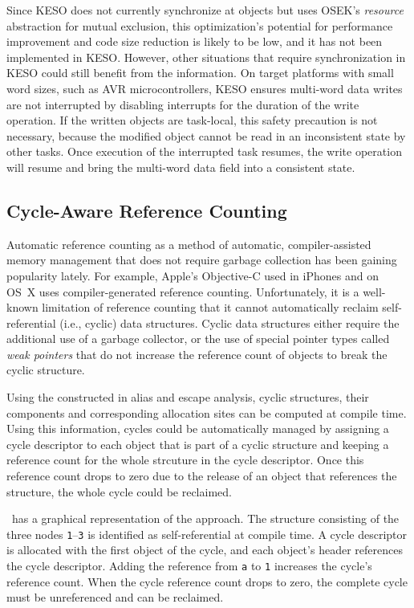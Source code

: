 			Since KESO does not currently synchronize at objects but uses OSEK's \emph{resource} abstraction for mutual
			exclusion, this optimization's potential for performance improvement and code size reduction is likely to be low,
			and it has not been implemented in KESO\@. However, other situations that require synchronization in KESO could
			still benefit from the information. On target platforms with small word sizes, such as AVR microcontrollers, KESO
			ensures multi-word data writes are not interrupted by disabling interrupts for the duration of the write
			operation. If the written objects are task-local, this safety precaution is not necessary, because the modified
			object cannot be read in an inconsistent state by other tasks. Once execution of the interrupted task resumes, the
			write operation will resume and bring the multi-word data field into a consistent state.

		\subsection{Cycle-Aware Reference Counting}
			\label{sub:ea:apps:cyclerefcnt}
			Automatic reference counting as a method of automatic, compiler-assisted memory management that does not require
			garbage collection has been gaining popularity lately. For example, Apple's Objective-C used in iPhones and on
			OS~X uses compiler-generated reference counting. Unfortunately, it is a well-known limitation of reference
			counting that it cannot automatically reclaim self-referential (i.e., cyclic) data structures. Cyclic data
			structures either require the additional use of a garbage collector, or the use of special pointer types called
			\emph{weak pointers} that do not increase the reference count of objects to break the cyclic structure.

			Using the  constructed in alias and escape analysis, cyclic structures, their components and
			corresponding allocation sites can be computed at compile time. Using this information, cycles could be
			automatically managed by assigning a cycle descriptor to each object that is part of a cyclic structure and
			keeping a reference count for the whole strcuture in the cycle descriptor. Once this reference count drops to zero
			due to the release of an object that references the structure, the whole cycle could be reclaimed.

			~has a graphical representation of the approach. The structure consisting of the
			three nodes \texttt{1}--\texttt{3} is identified as self-referential at compile time. A cycle descriptor is
			allocated with the first object of the cycle, and each object's header references the cycle descriptor. Adding the
			reference from \texttt{a} to \texttt{1} increases the cycle's reference count. When the cycle reference count
			drops to zero, the complete cycle must be unreferenced and can be reclaimed.

